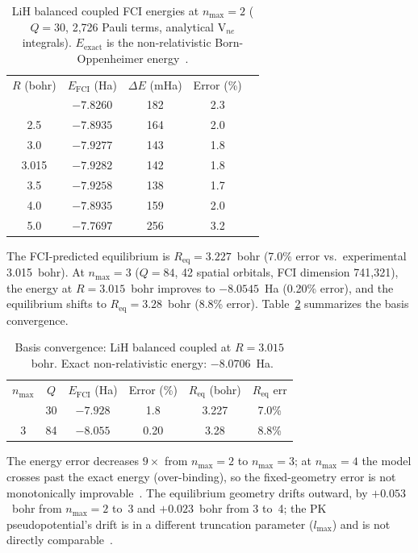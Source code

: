\documentclass[twocolumn,pra,amsmath,amssymb,superscriptaddress]{revtex4-2}
\newcommand{\gvq}[2]{#2}
\begin{document}
\begin{table}[h]
\caption{LiH balanced coupled FCI energies at $n_{\max}=2$
  ($Q=30$, \gvq{lih_balanced_pauli}{2{,}726} Pauli terms, analytical V$_{ne}$ integrals).
  $E_{\text{exact}}$ is the non-relativistic Born-Oppenheimer
  energy~\cite{Tung2011}.}
\label{tab:pes_nmax2}
\begin{ruledtabular}
\begin{tabular}{ccccc}
$R$ (bohr) & $E_{\text{FCI}}$ (Ha) & $\Delta E$ (mHa) & Error (\%) \\
\colrule
2.0  & $-7.8260$ & 182 & 2.3 \\
2.5  & $-7.8935$ & 164 & 2.0 \\
3.0  & $-7.9277$ & 143 & 1.8 \\
3.015 & $-7.9282$ & 142 & 1.8 \\
3.5  & $-7.9258$ & 138 & 1.7 \\
4.0  & $-7.8935$ & 159 & 2.0 \\
5.0  & $-7.7697$ & 256 & 3.2 \\
\end{tabular}
\end{ruledtabular}
\end{table}

The FCI-predicted equilibrium is $R_{\text{eq}} = 3.227$~bohr
(7.0\% error vs.\ experimental 3.015~bohr). At $n_{\max}=3$
($Q=84$, 42 spatial orbitals, FCI dimension 741{,}321), the energy
at $R=3.015$~bohr improves to $-8.0545$~Ha (0.20\% error), and
the equilibrium shifts to $R_{\text{eq}} = 3.28$~bohr (8.8\% error).
Table~\ref{tab:convergence} summarizes the basis convergence.

\begin{table}[h]
\caption{Basis convergence: LiH balanced coupled at $R=3.015$~bohr.
  Exact non-relativistic energy: $-8.0706$~Ha.}
\label{tab:convergence}
\begin{ruledtabular}
\begin{tabular}{cccccc}
$n_{\max}$ & $Q$ & $E_{\text{FCI}}$ (Ha) & Error (\%) & $R_{\text{eq}}$ (bohr) & $R_{\text{eq}}$ err \\
\colrule
2 & 30  & $-7.928$ & 1.8 & 3.227 & 7.0\% \\
3 & 84  & $-8.055$ & 0.20 & 3.28 & 8.8\% \\
\end{tabular}
\end{ruledtabular}
\end{table}

The energy error decreases $9\times$ from $n_{\max}=2$ to
$n_{\max}=3$; at $n_{\max}=4$ the model crosses past the exact energy
(over-binding), so the fixed-geometry error is not monotonically
improvable~\cite{GeoVac_Paper19}.  The equilibrium geometry drifts
outward, by $+0.053$~bohr from $n_{\max}=2$ to~3 and $+0.023$~bohr
from 3 to~4; the PK pseudopotential's drift is in a different
truncation parameter ($l_{\max}$) and is not directly
comparable~\cite{GeoVac_Paper19}.
\end{document}
